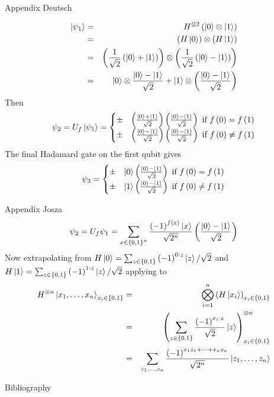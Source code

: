 \documentclass{beamer}
\begin{document}
\begin{frame}{Appendix Deutsch}

\begin{eqnarray*}
\Ket{\psi_{1}} & = & H^{\otimes2}\left(\Ket{0}\otimes\Ket{1}\right)\\
 & = & \left(H\Ket{0}\right)\otimes\left(H\Ket{1}\right)\\
 & = & \left(\frac{1}{\sqrt{2}}\left(\Ket{0}+\Ket{1}\right)\right)\otimes\left(\frac{1}{\sqrt{2}}\left(\Ket{0}-\Ket{1}\right)\right)\\
 & = & \Ket{0}\otimes\frac{\Ket{0}-\Ket{1}}{\sqrt{2}}+\Ket{1}\otimes\left(\frac{\Ket{0}-\Ket{1}}{\sqrt{2}}\right)
\end{eqnarray*}
Then 
\[
\psi_{2}=U_{f}\Ket{\psi_{1}}=\begin{cases}
\pm & \left(\frac{\Ket{0}+\Ket{1}}{\sqrt{2}}\right)\left(\frac{\Ket{0}-\Ket{1}}{\sqrt{2}}\right)\text{ if }f\left(0\right)=f\left(1\right)\\
\pm & \left(\frac{\Ket{0}-\Ket{1}}{\sqrt{2}}\right)\left(\frac{\Ket{0}-\Ket{1}}{\sqrt{2}}\right)\text{ if }f\left(0\right)\neq f\left(1\right)
\end{cases}
\]
The final Hadamard gate on the first qubit gives
\[
\psi_{3}=\begin{cases}
\pm & \Ket{0}\left(\frac{\Ket{0}-\Ket{1}}{\sqrt{2}}\right)\text{ if }f\left(0\right)=f\left(1\right)\\
\pm & \Ket{1}\left(\frac{\Ket{0}-\Ket{1}}{\sqrt{2}}\right)\text{ if }f\left(0\right)\neq f\left(1\right)
\end{cases}
\]
\end{frame}

\begin{frame}{Appendix Josza}
\[
\psi_{2}=U_{f}\psi_{1}=\sum_{x\in\left\{ 0,1\right\} ^{n}}\frac{\left(-1\right)^{f\left(x\right)}\Ket{x}}{\sqrt{2^{n}}}\left(\frac{\Ket{0}-\Ket{1}}{\sqrt{2}}\right)
\]
Now extrapolating from $H\Ket{0}=\sum_{z\in\left\{ 0,1\right\} }\left(-1\right)^{0\cdot z}\Ket{z}/\sqrt{2}$
and $H\Ket{1}=\sum_{z\in\left\{ 0,1\right\} }\left(-1\right)^{1\cdot z}\Ket{z}/\sqrt{2}$ applying
to 
\begin{eqnarray*}
H^{\otimes n}\Ket{x_{1},\dots,x_{n}}_{x_{i}\in\left\{ 0,1\right\} } & = & \bigotimes_{i=1}^{n}\left(H\Ket{x_{i}}\right)_{x_{i}\in\left\{ 0,1\right\} }\\
 & = & \left(\sum_{z\in\left\{ 0,1\right\} }\frac{\left(-1\right)^{x_{i}\cdot z}}{\sqrt{2}}\Ket{z}\right)_{x_{i}\in\left\{ 0,1\right\} }^{\otimes n}\\
 & = & \sum_{z_{1},\dots,z_{n}}\frac{\left(-1\right)^{x_{1}z_{1}+\cdots+x_{n}z_{n}}}{\sqrt{2^{n}}}\Ket{z_{1},\dots,z_{n}}
\end{eqnarray*}
\end{frame}


\begin{frame}[allowframebreaks]{Bibliography}
 
\end{frame}
\end{document}

